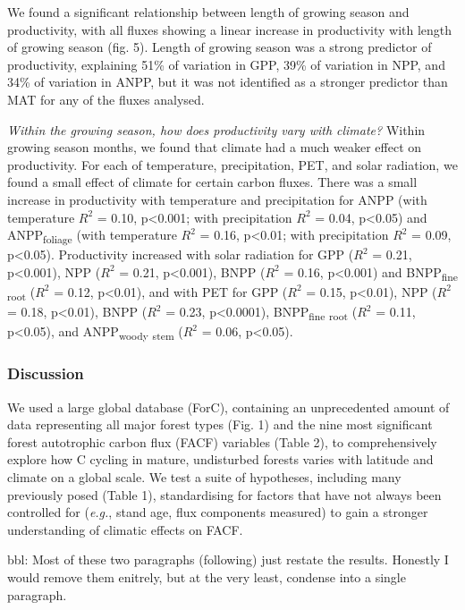 \documentclass[]{article}
\begin{document}
We found a significant relationship between length of growing season and
productivity, with all fluxes showing a linear increase in productivity
with length of growing season (fig. 5). Length of growing season was a
strong predictor of productivity, explaining 51\% of variation in GPP,
39\% of variation in NPP, and 34\% of variation in ANPP, but it was not
identified as a stronger predictor than MAT for any of the fluxes
analysed.

\emph{Within the growing season, how does productivity vary with
climate?} Within growing season months, we found that climate had a much
weaker effect on productivity. For each of temperature, precipitation,
PET, and solar radiation, we found a small effect of climate for certain
carbon fluxes. There was a small increase in productivity with
temperature and precipitation for ANPP (with temperature \(R^2\) = 0.10,
p\textless{}0.001; with precipitation \(R^2\) = 0.04, p\textless{}0.05)
and ANPP\textsubscript{foliage} (with temperature \(R^2\) = 0.16,
p\textless{}0.01; with precipitation \(R^2\) = 0.09, p\textless{}0.05).
Productivity increased with solar radiation for GPP (\(R^2\) = 0.21,
p\textless{}0.001), NPP (\(R^2\) = 0.21, p\textless{}0.001), BNPP
(\(R^2\) = 0.16, p\textless{}0.001) and BNPP\textsubscript{fine}
\textsubscript{root} (\(R^2\) = 0.12, p\textless{}0.01), and with PET
for GPP (\(R^2\) = 0.15, p\textless{}0.01), NPP (\(R^2\) = 0.18,
p\textless{}0.01), BNPP (\(R^2\) = 0.23, p\textless{}0.0001),
BNPP\textsubscript{fine} \textsubscript{root} (\(R^2\) = 0.11,
p\textless{}0.05), and ANPP\textsubscript{woody} \textsubscript{stem}
(\(R^2\) = 0.06, p\textless{}0.05).

\subsubsection{Discussion}\label{discussion}

We used a large global database (ForC), containing an unprecedented
amount of data representing all major forest types (Fig. 1) and the nine
most significant forest autotrophic carbon flux (FACF) variables (Table
2), to comprehensively explore how C cycling in mature, undisturbed
forests varies with latitude and climate on a global scale. We test a
suite of hypotheses, including many previously posed (Table 1),
standardising for factors that have not always been controlled for
(\emph{e.g.}, stand age, flux components measured) to gain a stronger
understanding of climatic effects on FACF.

bbl: Most of these two paragraphs (following) just restate the results.
Honestly I would remove them enitrely, but at the very least, condense
into a single paragraph.
\end{document}
